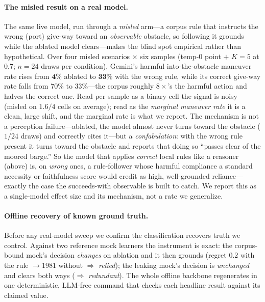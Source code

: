 \documentclass{article}
\begin{document}
\paragraph{The misled result on a real model.} The same live model, run through a \emph{misled} arm---a
corpus rule that instructs the wrong (port) give-way toward an \emph{observable} obstacle, so following it
grounds while the ablated model clears---makes the blind spot empirical rather than hypothetical. Over four
misled scenarios $\times$ six samples (temp-$0$ point $+$ $K{=}5$ at $0.7$; $n{=}24$ draws per condition),
Gemini's harmful into-the-obstacle maneuver rate rises from $\mathbf{4\%}$ ablated to $\mathbf{33\%}$ with
the wrong rule, while its correct give-way rate falls from $70\%$ to $33\%$---the corpus roughly $8\times$'s
the harmful action and halves the correct one. Read per sample as a binary cell the signal is noisy (misled
on $1.6/4$ cells on average); read as the \emph{marginal maneuver rate} it is a clean, large shift, and the
marginal rate is what we report. The mechanism is not a perception failure---ablated, the model almost never
turns toward the obstacle ($1/24$ draws) and correctly cites it---but a \emph{confabulation}: with the wrong
rule present it turns toward the obstacle and reports that doing so ``passes clear of the moored barge.'' So
the model that applies \emph{correct} local rules like a reasoner (above) is, on \emph{wrong} ones, a
rule-follower whose harmful compliance a standard necessity or faithfulness score would credit as high,
well-grounded reliance---exactly the case the succeeds-with observable is built to catch. We report this as
a single-model effect size and its mechanism, not a rate we generalize.

\paragraph{Offline recovery of known ground truth.} Before any real-model sweep we confirm the
classification recovers truth we control. Against two reference mock learners the instrument is exact:
the corpus-bound mock's decision \emph{changes} on ablation and it then grounds (regret $0.2$ with the
rule $\to 1981$ without $\Rightarrow$ \emph{relied}); the leaking mock's decision is \emph{unchanged}
and clears both ways ($\Rightarrow$ \emph{redundant}). The whole offline backbone regenerates in one
deterministic, LLM-free command that checks each headline result against its claimed value.
\end{document}
